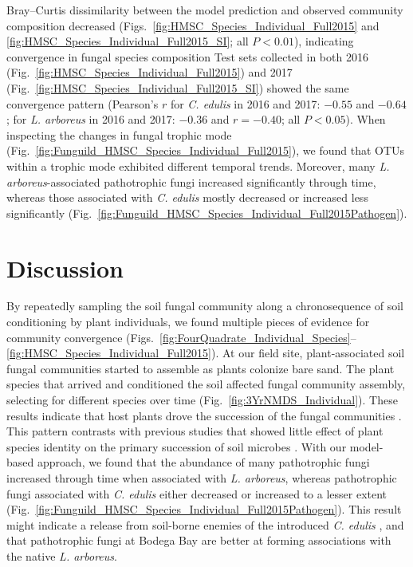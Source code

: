 Bray--Curtis dissimilarity between the model prediction and observed community composition decreased (Figs.~\ref{fig:HMSC_Species_Individual_Full2015} and \ref{fig:HMSC_Species_Individual_Full2015_SI}; all $P<0.01$), indicating convergence in fungal species composition
Test sets collected in both 2016 (Fig.~\ref{fig:HMSC_Species_Individual_Full2015}) and 2017 (Fig.~\ref{fig:HMSC_Species_Individual_Full2015_SI}) showed the same convergence pattern (Pearson's $r$ for \textit{C. edulis} in 2016 and 2017: $-0.55$ and $-0.64$; for \textit{L. arboreus} in 2016 and 2017: $-0.36$ and $r=-0.40$; all $P < 0.05$). 
When inspecting the changes in fungal trophic mode (Fig.~\ref{fig:Funguild_HMSC_Species_Individual_Full2015}), we found that OTUs within a trophic mode exhibited different temporal trends. Moreover, many \textit{L. arboreus}-associated pathotrophic fungi increased significantly through time, whereas those associated with \textit{C. edulis} mostly decreased or increased less significantly (Fig.~\ref{fig:Funguild_HMSC_Species_Individual_Full2015Pathogen}).
\par



\section{Discussion}
By repeatedly sampling the soil fungal community along a chronosequence of soil conditioning by plant individuals, we found multiple pieces of evidence for community convergence (Figs.~\ref{fig:FourQuadrate_Individual_Species}--\ref{fig:HMSC_Species_Individual_Full2015}).
At our field site, plant-associated soil fungal communities started to assemble as plants colonize bare sand. 
The plant species that arrived and conditioned the soil affected fungal community assembly, selecting for different species over time (Fig.~\ref{fig:3YrNMDS_Individual}). 
These results indicate that host plants drove the succession of the fungal communities \citep{RoyBolduc2016, Scheublin2004}. This pattern contrasts with previous studies that showed little effect of plant species identity on the primary succession of soil microbes \citep{BrownJumpponen2014, Sikes2014}.
With our model-based approach, we found that the abundance of many pathotrophic fungi increased through time when associated with \textit{L. arboreus}, whereas pathotrophic fungi associated with \textit{C. edulis} either decreased or increased to a lesser extent (Fig.~\ref{fig:Funguild_HMSC_Species_Individual_Full2015Pathogen}).
This result might indicate a release from soil-borne enemies of the introduced \textit{C. edulis} \citep{Keane2002, Callaway2004b}, and that pathotrophic fungi at Bodega Bay are better at forming associations with the native \textit{L. arboreus}.
\par


